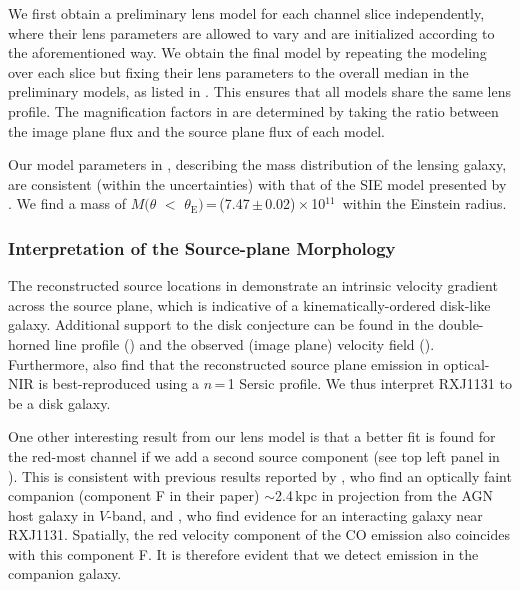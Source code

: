 \documentclass[]{emulateapj}
\begin{document}
We first obtain a preliminary lens model for each channel slice independently,
where their lens parameters are allowed to vary and are initialized according
to the aforementioned way. We obtain the final model
by repeating the modeling over each slice but fixing their lens parameters
to the overall median in the preliminary models,
as listed in .
This ensures that all models share the same lens profile.
The magnification factors in  are determined by taking the ratio
between the image plane flux and the source plane flux of each model.

Our model parameters in , describing
the mass distribution of the lensing galaxy, are consistent (within the uncertainties)
with that of the SIE model presented by . We find a mass of
$M(\theta$\,\,$<$\,\,$\theta_\textrm{E})$\,=\,(7.47\,$\pm$\,0.02)\,$\times$\,10$^{11}$\,\Msun
within the Einstein radius.

\subsubsection{Interpretation of the Source-plane Morphology} \label{sec:caveat}
The reconstructed source locations in  demonstrate
an intrinsic velocity gradient across the source plane, which is
indicative of a kinematically-ordered disk-like galaxy.
Additional support to the disk conjecture
can be found in the double-horned line profile ()
and the observed (image plane) velocity field (). Furthermore,
 also find that the reconstructed source plane emission in optical-NIR
is best-reproduced using a $n$\,=\,1 Sersic profile.
We thus interpret RXJ1131 to be a disk galaxy.

One other interesting result from our lens model is that a better fit is
found for the red-most channel if we add a second source component (see
top left panel in ). This is consistent with previous results
reported by \citet[hereafter B08]{Brewer08a}, who find an optically faint companion
(component F in their paper) $\sim$2.4\,kpc in projection from the AGN host galaxy in $V$-band,
and , who find evidence for an interacting galaxy near RXJ1131.
Spatially, the red velocity component of the CO emission
also coincides with this component F. It is therefore evident that we
detect \bco emission in the companion galaxy.
\end{document}
